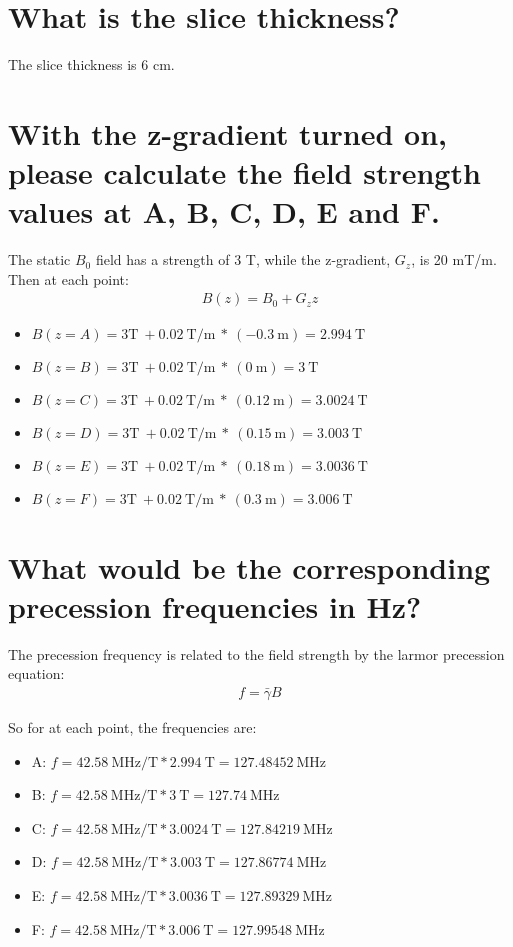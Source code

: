 \documentclass{article}
\begin{document}
\section{What is the slice thickness?}
The slice thickness is 6 cm.

\section{With the z-gradient turned on, please calculate the field strength values at A, B, C, D, E and F.}
The static $B_0$ field has a strength of 3 T, while the z-gradient, $G_z$, is 20 mT/m. Then at each point:
\begin{align*}
    B(z) = B_0 + G_z z
\end{align*}

\begin{itemize}
    \item $B(z = A) = 3 \textrm{T}\ + 0.02\ \textrm{T/m}\ *\ (-0.3\ \textrm{m}) = 2.994\ \textrm{T}$
    \item $B(z = B) = 3 \textrm{T}\ + 0.02\ \textrm{T/m}\ *\ (0\ \textrm{m}) = 3\ \textrm{T}$
    \item $B(z = C) = 3 \textrm{T}\ + 0.02\ \textrm{T/m}\ *\ (0.12\ \textrm{m}) = 3.0024\ \textrm{T}$
    \item $B(z = D) = 3 \textrm{T}\ + 0.02\ \textrm{T/m}\ *\ (0.15\ \textrm{m}) = 3.003\ \textrm{T}$
    \item $B(z = E) = 3 \textrm{T}\ + 0.02\ \textrm{T/m}\ *\ (0.18\ \textrm{m}) = 3.0036\ \textrm{T}$
    \item $B(z = F) = 3 \textrm{T}\ + 0.02\ \textrm{T/m}\ *\ (0.3\ \textrm{m}) = 3.006\ \textrm{T}$
\end{itemize}

\section{What would be the corresponding precession frequencies in Hz?}
The precession frequency is related to the field strength by the larmor precession equation:
\begin{align*}
    f = \bar{\gamma}B
\end{align*}

So for at each point, the frequencies are:

\begin{itemize}
    \item A: $f = 42.58\ \textrm{MHz/T} * 2.994\ \textrm{T} = 127.48452\ \textrm{MHz}$
    \item B: $f = 42.58\ \textrm{MHz/T} * 3\ \textrm{T} = 127.74\ \textrm{MHz}$
    \item C: $f = 42.58\ \textrm{MHz/T} * 3.0024\ \textrm{T} = 127.84219\ \textrm{MHz}$
    \item D: $f = 42.58\ \textrm{MHz/T} * 3.003\ \textrm{T} = 127.86774\ \textrm{MHz}$
    \item E: $f = 42.58\ \textrm{MHz/T} * 3.0036\ \textrm{T} = 127.89329\ \textrm{MHz}$
    \item F: $f = 42.58\ \textrm{MHz/T} * 3.006\ \textrm{T} = 127.99548\ \textrm{MHz}$
\end{itemize}
\end{document}
